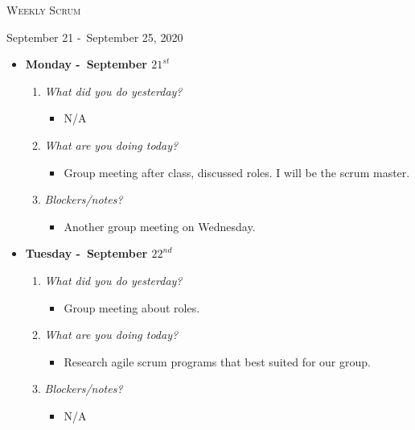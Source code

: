 \centerline{\LARGE\textsc{Weekly Scrum}}
\centerline{September 21 -\ September 25, 2020}
\textbf{}
\begin{itemize}
  \item[] \textbf{\large Monday -\ September \(21^{st}\)}
  \begin{enumerate}
    \item \textsl{What did you do yesterday?}
    \begin{itemize}
      \item N/A
    \end{itemize}
    \item \textsl{What are you doing today?}
    \begin{itemize}
      \item Group meeting after class, discussed roles. I will be the scrum master.
    \end{itemize}
    \item \textsl{Blockers/notes?}
    \begin{itemize}
      \item Another group meeting on Wednesday.
    \end{itemize}
  \end{enumerate}
\end{itemize}
\textbf{}
\begin{itemize}
  \item[] \textbf{\large Tuesday -\ September \(22^{nd}\)}
  \begin{enumerate}
    \item \textsl{What did you do yesterday?}
    \begin{itemize}
      \item Group meeting about roles.
    \end{itemize}
    \item \textsl{What are you doing today?}
    \begin{itemize}
      \item Research agile scrum programs that best suited for our group.
    \end{itemize}
    \item \textsl{Blockers/notes?}
    \begin{itemize}
      \item N/A
    \end{itemize}
  \end{enumerate}
\end{itemize}
\textbf{}
